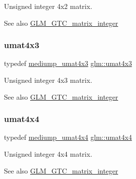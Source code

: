 Unsigned integer 4x2 matrix. \begin{DoxySeeAlso}{See also}
\hyperlink{group__gtc__matrix__integer}{G\+L\+M\+\_\+\+G\+T\+C\+\_\+matrix\+\_\+integer} 
\end{DoxySeeAlso}
\mbox{\label{group__gtc__matrix__integer_ga08373f5588a54da1a48e5e55c7d51004}} 
\subsubsection{\texorpdfstring{umat4x3}{umat4x3}}
{\footnotesize\ttfamily typedef \hyperlink{group__gtc__matrix__integer_gac91ed5aa76fe160d5ab5d31e2b94d95b}{mediump\+\_\+umat4x3} \hyperlink{group__gtc__matrix__integer_ga08373f5588a54da1a48e5e55c7d51004}{glm\+::umat4x3}}

Unsigned integer 4x3 matrix. \begin{DoxySeeAlso}{See also}
\hyperlink{group__gtc__matrix__integer}{G\+L\+M\+\_\+\+G\+T\+C\+\_\+matrix\+\_\+integer} 
\end{DoxySeeAlso}
\mbox{\label{group__gtc__matrix__integer_gae0931b79e808fb0983848778a60eb548}} 
\subsubsection{\texorpdfstring{umat4x4}{umat4x4}}
{\footnotesize\ttfamily typedef \hyperlink{group__gtc__matrix__integer_ga7141a9d9f1c26521e397be34d19c1b8f}{mediump\+\_\+umat4x4} \hyperlink{group__gtc__matrix__integer_gae0931b79e808fb0983848778a60eb548}{glm\+::umat4x4}}

Unsigned integer 4x4 matrix. \begin{DoxySeeAlso}{See also}
\hyperlink{group__gtc__matrix__integer}{G\+L\+M\+\_\+\+G\+T\+C\+\_\+matrix\+\_\+integer} 
\end{DoxySeeAlso}
